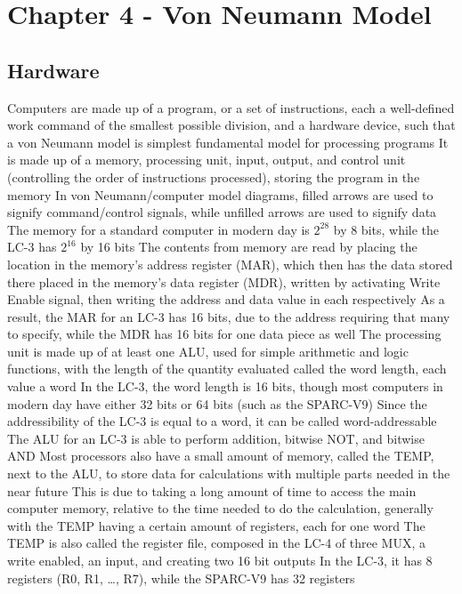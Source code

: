 \documentclass[11 pt, twoside]{article}
\newenvironment{outline*}
{
	\begin{outline}[enumerate]
	}
	{\end{outline}
}
\begin{document}
\section{Chapter 4 - Von Neumann Model}
\subsection{Hardware}
\begin{outline*}
\1 Computers are made up of a program, or a set of instructions, each a well-defined work command of the smallest possible division, and a hardware device, such that a von Neumann model is simplest fundamental model for processing programs
\2 It is made up of a memory, processing unit, input, output, and control unit (controlling the order of instructions processed), storing the program in the memory
\2 In von Neumann/computer model diagrams, filled arrows are used to signify command/control signals, while unfilled arrows are used to signify data
\1 The memory for a standard computer in modern day is $2^{28}$ by 8 bits, while the LC-3 has $2^{16}$ by 16 bits
\2 The contents from memory are read by placing the location in the memory's address register (MAR), which then has the data stored there placed in the memory's data register (MDR), written by activating Write Enable signal, then writing the address and data value in each respectively
\2 As a result, the MAR for an LC-3 has 16 bits, due to the address requiring that many to specify, while the MDR has 16 bits for one data piece as well
\1 The processing unit is made up of at least one ALU, used for simple arithmetic and logic functions, with the length of the quantity evaluated called the word length, each value a word
\2 In the LC-3, the word length is 16 bits, though most computers in modern day have either 32 bits or 64 bits (such as the SPARC-V9)
\3 Since the addressibility of the LC-3 is equal to a word, it can be called word-addressable
\2 The ALU for an LC-3 is able to perform addition, bitwise NOT, and bitwise AND
\2 Most processors also have a small amount of memory, called the TEMP, next to the ALU, to store data for calculations with multiple parts needed in the near future
\3 This is due to taking a long amount of time to access the main computer memory, relative to the time needed to  do the calculation, generally with the TEMP having a certain amount of registers, each for one word
\3 The TEMP is also called the register file, composed in the LC-4 of three MUX, a write enabled, an input, and creating two 16 bit outputs
\3 In the LC-3, it has 8 registers (R0, R1, \dots, R7), while the SPARC-V9 has 32 registers

\end{outline*}
\end{document}
